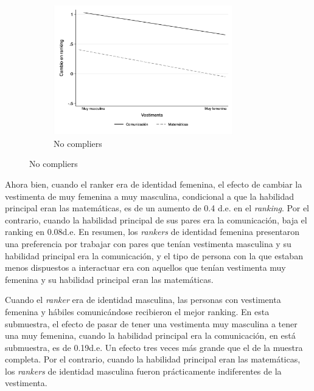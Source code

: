 \begin{figure}[t!]
\begin{subfigure}[t]{0.49\textwidth}
        \centering
        \caption{No compliers}
        \includegraphics[width=7.8cm]{Images/h3_predicted_rank_score_nocomplier.png}
    \end{subfigure}
\end{figure}
 
Ahora bien, cuando el ranker era de identidad femenina, el efecto de cambiar la vestimenta de muy femenina a muy masculina, condicional a que la habilidad principal eran las matemáticas, es de un aumento de 0.4 d.e. en el \textit{ranking}. Por el contrario, cuando la habilidad principal de sus pares era la comunicación, baja el ranking en 0.08d.e. En resumen, los \textit{rankers} de identidad femenina presentaron una preferencia por trabajar con pares que tenían vestimenta masculina y su habilidad principal era la comunicación, y el tipo de persona con la que estaban menos dispuestos a interactuar era con aquellos que tenían vestimenta muy femenina y su habilidad principal eran las matemáticas. 

Cuando el \textit{ranker} era de identidad masculina, las personas con vestimenta femenina y hábiles comunicándose recibieron el mejor ranking. En esta submuestra, el efecto de pasar de tener una vestimenta muy masculina a tener una muy femenina, cuando la habilidad principal era la comunicación, en está submuestra, es de 0.19d.e. Un efecto tres veces más grande que el de la muestra completa. Por el contrario, cuando la habilidad principal eran las matemáticas, los \textit{rankers} de identidad masculina fueron prácticamente indiferentes de la vestimenta. 

